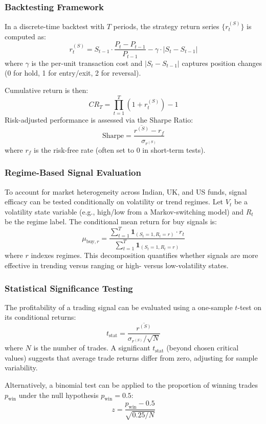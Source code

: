 \subsubsection{Backtesting Framework}

In a discrete-time backtest with $T$ periods, the strategy return series $\{r_t^{(S)}\}$ is computed as:
\[
r_t^{(S)} = S_{t-1} \cdot \frac{P_t - P_{t-1}}{P_{t-1}} - \gamma \cdot |S_t - S_{t-1}|
\]
where $\gamma$ is the per-unit transaction cost and $|S_t - S_{t-1}|$ captures position changes (0 for hold, 1 for entry/exit, 2 for reversal).

Cumulative return is then:
\[
CR_T = \prod_{t=1}^T (1 + r_t^{(S)}) - 1
\]
Risk-adjusted performance is assessed via the Sharpe Ratio:
\[
\text{Sharpe} = \frac{\overline{r^{(S)}} - r_f}{\sigma_{r^{(S)}}}
\]
where $r_f$ is the risk-free rate (often set to 0 in short-term tests).

\subsubsection{Regime-Based Signal Evaluation}

To account for market heterogeneity across Indian, UK, and US funds, signal efficacy can be tested conditionally on volatility or trend regimes. Let $V_t$ be a volatility state variable (e.g., high/low from a Markov-switching model) and $R_t$ be the regime label. The conditional mean return for buy signals is:
\[
\mu_{\text{buy}, r} = \frac{\sum_{t=1}^T \mathbf{1}_{(S_t=1, R_t=r)} \cdot r_t}{\sum_{t=1}^T \mathbf{1}_{(S_t=1, R_t=r)}}
\]
where $r$ indexes regimes. This decomposition quantifies whether signals are more effective in trending versus ranging or high- versus low-volatility states.

\subsubsection{Statistical Significance Testing}

The profitability of a trading signal can be evaluated using a one-sample $t$-test on its conditional returns:
\[
t_{\text{stat}} = \frac{\overline{r^{(S)}}}{\sigma_{r^{(S)}} / \sqrt{N}}
\]
where $N$ is the number of trades. A significant $t_{\text{stat}}$ (beyond chosen critical values) suggests that average trade returns differ from zero, adjusting for sample variability.

Alternatively, a binomial test can be applied to the proportion of winning trades $p_{\text{win}}$ under the null hypothesis $p_{\text{win}} = 0.5$:
\[
z = \frac{p_{\text{win}} - 0.5}{\sqrt{0.25 / N}}
\]

